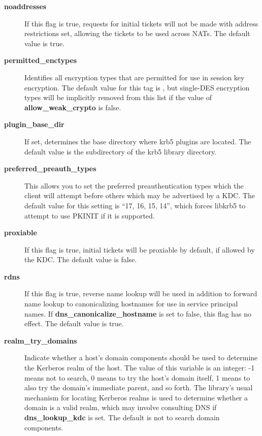 \documentclass[letterpaper,10pt,english]{sphinxmanual}
\begin{document}
\begin{description}
\item[{\textbf{noaddresses}}] \leavevmode
If this flag is true, requests for initial tickets will not be
made with address restrictions set, allowing the tickets to be
used across NATs.  The default value is true.

\item[{\textbf{permitted\_enctypes}}] \leavevmode
Identifies all encryption types that are permitted for use in
session key encryption.  The default value for this tag is
, but single-DES encryption types will be implicitly
removed from this list if the value of \textbf{allow\_weak\_crypto} is
false.

\item[{\textbf{plugin\_base\_dir}}] \leavevmode
If set, determines the base directory where krb5 plugins are
located.  The default value is the  subdirectory
of the krb5 library directory.

\item[{\textbf{preferred\_preauth\_types}}] \leavevmode
This allows you to set the preferred preauthentication types which
the client will attempt before others which may be advertised by a
KDC.  The default value for this setting is ``17, 16, 15, 14'',
which forces libkrb5 to attempt to use PKINIT if it is supported.

\item[{\textbf{proxiable}}] \leavevmode
If this flag is true, initial tickets will be proxiable by
default, if allowed by the KDC.  The default value is false.

\item[{\textbf{rdns}}] \leavevmode
If this flag is true, reverse name lookup will be used in addition
to forward name lookup to canonicalizing hostnames for use in
service principal names.  If \textbf{dns\_canonicalize\_hostname} is set
to false, this flag has no effect.  The default value is true.

\item[{\textbf{realm\_try\_domains}}] \leavevmode
Indicate whether a host's domain components should be used to
determine the Kerberos realm of the host.  The value of this
variable is an integer: -1 means not to search, 0 means to try the
host's domain itself, 1 means to also try the domain's immediate
parent, and so forth.  The library's usual mechanism for locating
Kerberos realms is used to determine whether a domain is a valid
realm, which may involve consulting DNS if \textbf{dns\_lookup\_kdc} is
set.  The default is not to search domain components.


\end{description}
\end{document}
